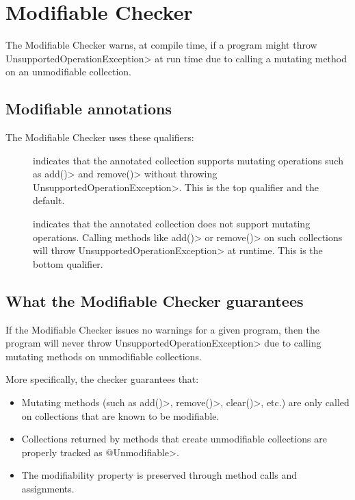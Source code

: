 \chapter{Modifiable Checker\label{modifiable-checker}}

The Modifiable Checker warns, at compile time, if a program might throw
\<UnsupportedOperationException> at run time due to calling a mutating method
on an unmodifiable collection.

\section{Modifiable annotations\label{modifiable-annotations}}

The Modifiable Checker uses these qualifiers:

\begin{description}
\item[]
  indicates that the annotated collection supports mutating operations such as
  \<add()> and \<remove()> without throwing \<UnsupportedOperationException>.
  This is the top qualifier and the default.

\item[]
  indicates that the annotated collection does not support mutating operations.
  Calling methods like \<add()> or \<remove()> on such collections will throw
  \<UnsupportedOperationException> at runtime. This is the bottom qualifier.
\end{description}

\section{What the Modifiable Checker guarantees\label{modifiable-guarantees}}

If the Modifiable Checker issues no warnings for a given program, then the
program will never throw \<UnsupportedOperationException> due to calling
mutating methods on unmodifiable collections.

More specifically, the checker guarantees that:
\begin{itemize}
\item Mutating methods (such as \<add()>, \<remove()>, \<clear()>, etc.) are
      only called on collections that are known to be modifiable.
\item Collections returned by methods that create unmodifiable collections
      are properly tracked as \<@Unmodifiable>.
\item The modifiability property is preserved through method calls and
      assignments.
\end{itemize}

